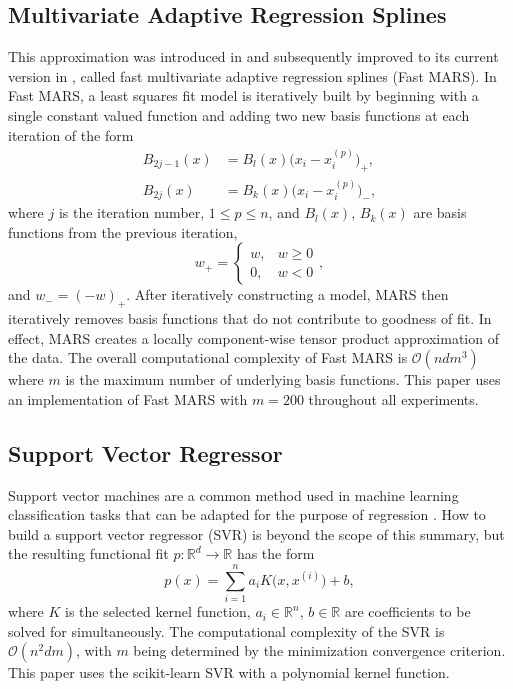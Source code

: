 \documentclass[smallextended,final]{svjour3}  %
\begin{document}
\subsection{Multivariate Adaptive Regression Splines}
\label{sec:mars}
This approximation was introduced in \cite{friedman1991multivariate}
and subsequently improved to its current version in
\cite{stanford1993fast}, called fast multivariate adaptive regression
splines (Fast MARS). In Fast MARS, a least squares fit model is
iteratively built by beginning with a single constant valued function
and adding two new basis functions at each iteration of the form
\begin{align*}
  B_{2j-1}(x) &= B_l(x) \bigl(x_i-x^{(p)}_i\bigr)_+, \\
  B_{2j}(x) &= B_k(x) \bigl(x_i-x^{(p)}_i\bigr)_- ,
\end{align*}
where $j$ is the iteration number, $1 \le p \le n$, and $B_l(x)$,
$B_k(x)$ are basis functions from the previous iteration,
 $$w_+ = \begin{cases} w, & w \geq 0 \\ 0, & w < 0 \end{cases},$$
and $w_- = (-w)_+$. After iteratively constructing a model, MARS then
iteratively removes basis functions that do not contribute to goodness
of fit. In effect, MARS creates a locally component-wise tensor
product approximation of the data. The overall computational
complexity of Fast MARS is $\mathcal{O}(n d m^3)$ where $m$ is the
maximum number of underlying basis functions. This paper uses an
implementation of Fast MARS \cite{rudy2017pyearth} with $m = 200$
throughout all experiments.

\subsection{Support Vector Regressor}
\label{sec:svr}
Support vector machines are a common method used in machine learning
classification tasks that can be adapted for the purpose of regression
\cite{basak2007support}. How to build a support vector regressor (SVR)
is beyond the scope of this summary, but the resulting functional fit
$p : \mathbb{R}^d \rightarrow \mathbb{R}$ has the form
 $$ p(x)  = \sum_{i=1}^{n}a_i K\bigl(x,x^{(i)}\bigr) + b ,$$
where $K$ is the selected kernel function, $a_i \in \mathbb{R}^n$, 
$b \in \mathbb{R}$ are coefficients to be solved for simultaneously.
The computational complexity of the SVR is $\mathcal{O}(n^2dm)$, with
$m$ being determined by the minimization convergence criterion. This
paper uses the scikit-learn SVR \cite{scikit-learn} with a polynomial
kernel function.
\end{document}
